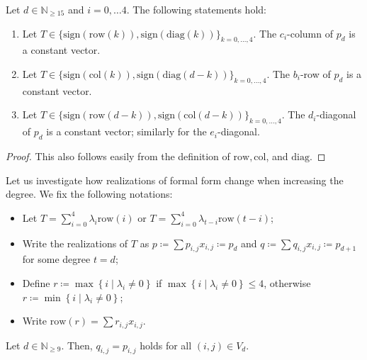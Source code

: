   \begin{proposition}
    Let \( d \in \mathbb{N}_{\geq 15} \) and \( i = 0, \dots 4 \).
    The following statements hold:
    \begin{enumerate}
    \item Let $T \in \{\mathrm{sign}(\mathrm{row}(k)), \mathrm{sign}(\mathrm{diag}(k)) \}_{k = 0, \dots, 4}$. The $c_{i}$-column of $p_d$ is a constant vector. 
  
    \item Let $T \in \{\mathrm{sign}( \mathrm{col}(k)),\mathrm{sign}(\mathrm{diag}(d-k)) \}_{k = 0, \dots, 4}$. The $b_{i}$-row of $p_d$ is a constant vector. 
  
    \item Let $T \in \{ \mathrm{sign}(\mathrm{row}(d-k)), \mathrm{sign}(\mathrm{col}(d-k)) \}_{k = 0, \dots, 4}$. The $d_{i}$-diagonal of $p_d$ is a constant vector; similarly for the $e_{i}$-diagonal. 
    \end{enumerate}
  \end{proposition}
  
  \begin{proof}
    This also follows easily from the definition of $\mathrm{row}, \mathrm{col}$, and \(\mathrm{diag} \). 
  \end{proof}
  
  Let us investigate how realizations of formal form change when increasing the degree. We fix the following notations:
\begin{itemize}
    \item Let \( T = \sum_{i=0}^{4}  \lambda_{i} \mathrm{row}(i)  \) or \( T = \sum_{i=0}^{4}  \lambda_{t-i} \mathrm{row}(t-i) \);
    \item Write the realizations of \( T \) as \( p \coloneqq \sum p_{i,j}x_{i,j}  \coloneqq p_d  \) and \( q \coloneqq \sum q_{i,j}x_{i,j} \coloneqq p_{d+1} \) for some degree \( t = d \);
    \item Define \( r \coloneqq \max\left\{ i \mid \lambda_i \neq 0 \right\} \) if \(  \max\left\{ i \mid \lambda_i \neq 0 \right\} \leq 4 \), otherwise \( r \coloneqq \min\left\{ i \mid \lambda_i \neq 0 \right\} \); 
    \item Write \( \mathrm{row}(r) = \sum r_{i,j}x_{i,j} \).
\end{itemize}  


\begin{lemma}\label{prop:row_extend_d}
    Let \( d \in \mathbb{N}_{\geq 9} \). Then, \( q_{i,j} = p_{i,j} \) holds for all \( (i,j) \in V_d \).
\end{lemma}
  
